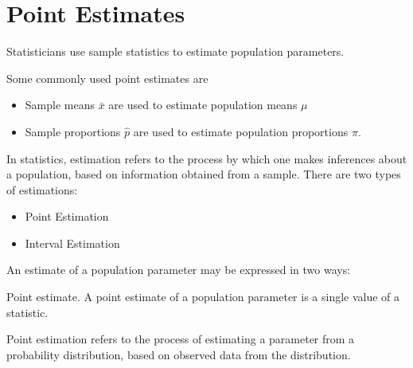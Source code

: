 \documentclass[]{report}
\begin{document}

\section{Point Estimates}

Statisticians use sample statistics to estimate population parameters. 

Some commonly used point estimates are
\begin{itemize}
\item Sample means $\bar{x}$ are used to estimate population means $\mu$
\item Sample proportions $\hat{p}$ are used to estimate population proportions $\pi$.
\end{itemize}





In statistics, estimation refers to the process by which one makes inferences about a population, based on information obtained from a sample.
There are two types of estimations:

\begin{itemize}
\item Point Estimation
\item Interval Estimation
\end{itemize}



An estimate of a population parameter may be expressed in two ways:

Point estimate. A point estimate of a population parameter is a single value of a statistic. 




Point estimation refers to the process of estimating a parameter from a probability 
distribution, based on observed data from the distribution. 



\end{document}
